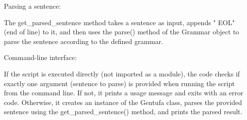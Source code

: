 Parsing a sentence:

The get\_parsed\_sentence method takes a sentence as input, appends " EOL" (end of line) to it, and then uses the parse() method of the Grammar object to parse the sentence according to the defined grammar.

Command-line interface:

If the script is executed directly (not imported as a module), the code checks if exactly one argument (sentence to parse) is provided when running the script from the command line. If not, it prints a usage message and exits with an error code. Otherwise, it creates an instance of the Gentufa class, parses the provided sentence using the get\_parsed\_sentence() method, and prints the parsed result.
